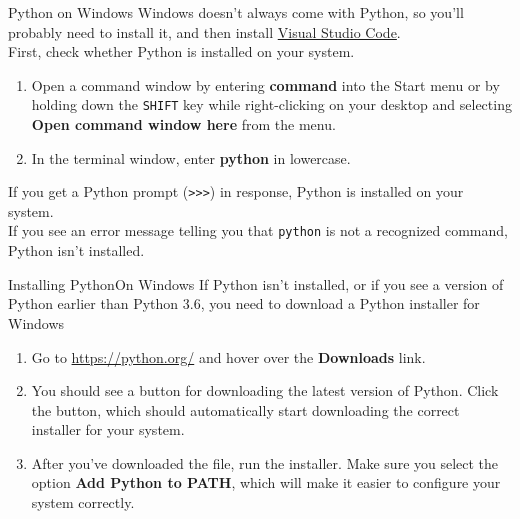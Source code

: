 \documentclass[aspectratio=169]{beamer}
\begin{document}
\begin{frame}[fragile]{Python on Windows}
    Windows doesn't always come with Python, so you'll probably need to install it, and then install \href{https://code.visualstudio.com/Download}{Visual Studio Code}. \\
    \vspace{10pt}
    First, check whether Python is installed on your system. \\
    \vspace{10pt}
        \begin{enumerate}[label={\arabic*.},itemsep=5pt]
            \item Open a command window by entering \textbf{command} into the Start menu or by holding down the \texttt{SHIFT} key while right-clicking on your desktop and selecting \textbf{Open command window here} from the menu.
            \item In the terminal window, enter \textbf{python} in lowercase.
        \end{enumerate}
    \vspace{10pt}
    If you get a Python prompt (\verb|>>>|) in response, Python is installed on your system.\\
    \vspace{10pt}
    If you see an error message telling you that \texttt{python} is not a recognized command, Python isn’t installed.
\end{frame}


\begin{frame}{Installing Python}{On Windows}
    If Python isn't installed, or if you see a version of Python earlier than Python 3.6, you need to download a Python installer for Windows
    \vspace{10pt}
    \begin{enumerate}[label={\arabic*.},itemsep=5pt]
        \item Go to \href{https://python.org/}{https://python.org/} and hover over the \textbf{Downloads} link.
        \item You should see a button for downloading the latest version of Python.
            Click the button, which should automatically start downloading the correct installer for your system.
        \item After you've downloaded the file, run the installer.
            Make sure you select the option \textbf{Add Python to PATH}, which will make it easier to configure your system correctly.
    \end{enumerate}
\end{frame}
\end{document}
